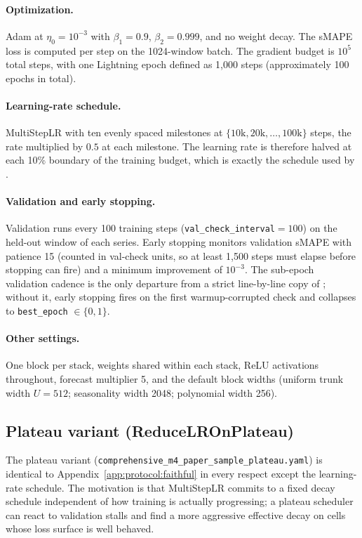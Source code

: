 \paragraph{Optimization.} Adam at $\eta_0 = 10^{-3}$ with
$\beta_1 = 0.9$, $\beta_2 = 0.999$, and no weight decay. The sMAPE loss is
computed per step on the 1024-window batch. The gradient budget is
$10^{5}$ total steps, with one Lightning epoch defined as 1{,}000 steps
(approximately 100 epochs in total).

\paragraph{Learning-rate schedule.} MultiStepLR with ten evenly spaced
milestones at $\{10\text{k}, 20\text{k}, \ldots, 100\text{k}\}$ steps, the
rate multiplied by $0.5$ at each milestone. The learning rate is therefore
halved at each 10\% boundary of the training budget, which is exactly the
schedule used by \citet{oreshkin2020nbeats}.

\paragraph{Validation and early stopping.} Validation runs every 100
training steps (\texttt{val\_check\_interval}$=100$) on the held-out window
of each series. Early stopping monitors validation sMAPE with patience 15
(counted in val-check units, so at least 1{,}500 steps must elapse before
stopping can fire) and a minimum improvement of $10^{-3}$. The sub-epoch
validation cadence is the only departure from a strict line-by-line copy of
\citet{oreshkin2020nbeats}; without it, early stopping fires on the first
warmup-corrupted check and collapses to \texttt{best\_epoch} $\in \{0,1\}$.

\paragraph{Other settings.} One block per stack, weights shared within each
stack, ReLU activations throughout, forecast multiplier 5, and the default
block widths (uniform trunk width $U = 512$; seasonality width 2048;
polynomial width 256).

\subsection{Plateau variant (ReduceLROnPlateau)}
\label{app:protocol:plateau}

The plateau variant (\texttt{comprehensive\_m4\_paper\_sample\_plateau.yaml})
is identical to Appendix~\ref{app:protocol:faithful} in every respect except
the learning-rate schedule. The motivation is that MultiStepLR commits to a
fixed decay schedule independent of how training is actually progressing; a
plateau scheduler can react to validation stalls and find a more aggressive
effective decay on cells whose loss surface is well behaved.

